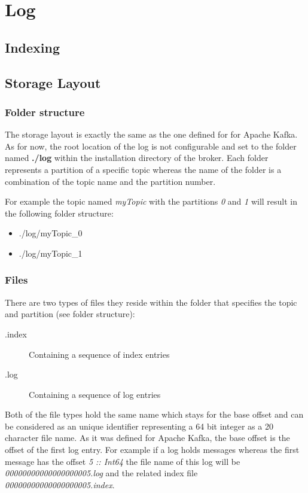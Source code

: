 \section{Log}

\subsection{Indexing}

\subsection{Storage Layout}
\label{broker-storage}

\subsubsection{Folder structure}

The storage layout is exactly the same as the one defined for for Apache Kafka.
 As for now, the root location of the log is not configurable and
set to the folder named \textbf{./log} within the installation directory of the
broker. Each folder represents a partition of a specific topic whereas the name
of the folder is a combination of the topic name and the partition number. 

For example the topic named \textit{myTopic} with the partitions \textit{0} and
\textit{1} will result in the following folder structure:

\begin{itemize}
    \item ./log/myTopic\_0
    \item ./log/myTopic\_1
\end{itemize}

\subsubsection{Files}

There are two types of files they reside within the folder that specifies the
topic and partition (see folder structure):

\begin{description}
    \item[.index] Containing a sequence of index entries
    \item[.log] Containing a sequence of log entries
\end{description}

Both of the file types hold the same name which stays for the base offset and
can be considered as an unique identifier representing a 64 bit integer as a 20
character file name. As it was defined for Apache Kafka, the base offset is the
offset of the first log entry. For example if a log holds messages whereas the
first message has the offset \textit{5 :: Int64} the file name of this log will
be \textit{00000000000000000005.log} and the related index file
\textit{00000000000000000005.index}.

